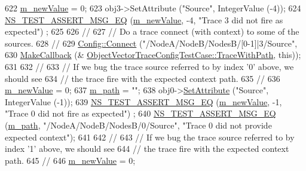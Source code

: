 \begin{DoxyCode}
622   \hyperlink{classObjectVectorTraceConfigTestCase_aa09d9661bd785bbeb9db030419138e5f}{m\_newValue} = 0;
623   obj3->SetAttribute (\textcolor{stringliteral}{"Source"}, IntegerValue (-4));
624   \hyperlink{group__testing_ga2a9d78cffb3db8e867c35fff0b698cf5}{NS\_TEST\_ASSERT\_MSG\_EQ} (\hyperlink{classObjectVectorTraceConfigTestCase_aa09d9661bd785bbeb9db030419138e5f}{m\_newValue}, -4, \textcolor{stringliteral}{"Trace 3 did not fire as expected"})
      ;
625 
626   \textcolor{comment}{//}
627   \textcolor{comment}{// Do a trace connect (with context) to some of the sources.}
628   \textcolor{comment}{//}
629   \hyperlink{group__config_ga4014f151241cd0939b6cb64409605736}{Config::Connect} (\textcolor{stringliteral}{"/NodeA/NodeB/NodesB/[0-1]|3/Source"}, 
630                    \hyperlink{group__makecallbackmemptr_ga9376283685aa99d204048d6a4b7610a4}{MakeCallback} (&
      \hyperlink{classObjectVectorTraceConfigTestCase_ada1f9e79bf60cc41b23aa5dc9f7d7e01}{ObjectVectorTraceConfigTestCase::TraceWithPath}, \textcolor{keyword}{this}));
631 
632   \textcolor{comment}{// }
633   \textcolor{comment}{// If we bug the trace source referred to by index '0' above, we should see }
634   \textcolor{comment}{// the trace fire with the expected context path.}
635   \textcolor{comment}{//}
636   \hyperlink{classObjectVectorTraceConfigTestCase_aa09d9661bd785bbeb9db030419138e5f}{m\_newValue} = 0;
637   \hyperlink{classObjectVectorTraceConfigTestCase_ab52e8b427f81671e823abbbda41dea69}{m\_path} = \textcolor{stringliteral}{""};
638   obj0->\hyperlink{classns3_1_1ObjectBase_ac60245d3ea4123bbc9b1d391f1f6592f}{SetAttribute} (\textcolor{stringliteral}{"Source"}, IntegerValue (-1));
639   \hyperlink{group__testing_ga2a9d78cffb3db8e867c35fff0b698cf5}{NS\_TEST\_ASSERT\_MSG\_EQ} (\hyperlink{classObjectVectorTraceConfigTestCase_aa09d9661bd785bbeb9db030419138e5f}{m\_newValue}, -1, \textcolor{stringliteral}{"Trace 0 did not fire as expected"})
      ;
640   \hyperlink{group__testing_ga2a9d78cffb3db8e867c35fff0b698cf5}{NS\_TEST\_ASSERT\_MSG\_EQ} (\hyperlink{classObjectVectorTraceConfigTestCase_ab52e8b427f81671e823abbbda41dea69}{m\_path}, \textcolor{stringliteral}{"/NodeA/NodeB/NodesB/0/Source"}, \textcolor{stringliteral}{"Trace 0 did
       not provide expected context"});
641 
642   \textcolor{comment}{// }
643   \textcolor{comment}{// If we bug the trace source referred to by index '1' above, we should see }
644   \textcolor{comment}{// the trace fire with the expected context path.}
645   \textcolor{comment}{//}
646   \hyperlink{classObjectVectorTraceConfigTestCase_aa09d9661bd785bbeb9db030419138e5f}{m\_newValue} = 0;

\end{DoxyCode}
